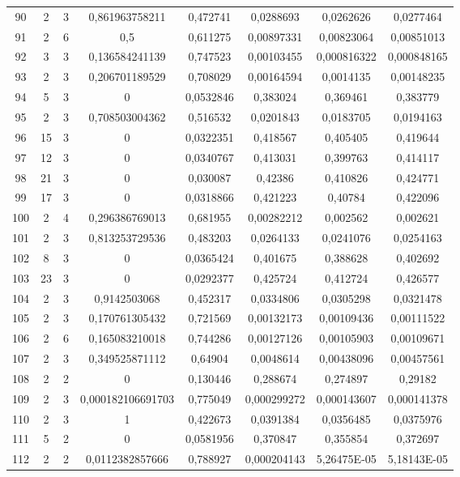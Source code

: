 \begin{longtable}{|c|c|c|c|c|c|c|c|}
90 & 2 & 3 & 0,861963758211 & 0,472741 & 0,0288693 & 0,0262626 & 0,0277464  \\
91 & 2 & 6 & 0,5 & 0,611275 & 0,00897331 & 0,00823064 & 0,00851013  \\
92 & 3 & 3 & 0,136584241139 & 0,747523 & 0,00103455 & 0,000816322 & 0,000848165  \\
93 & 2 & 3 & 0,206701189529 & 0,708029 & 0,00164594 & 0,0014135 & 0,00148235  \\
94 & 5 & 3 & 0 & 0,0532846 & 0,383024 & 0,369461 & 0,383779  \\
95 & 2 & 3 & 0,708503004362 & 0,516532 & 0,0201843 & 0,0183705 & 0,0194163  \\
96 & 15 & 3 & 0 & 0,0322351 & 0,418567 & 0,405405 & 0,419644  \\
97 & 12 & 3 & 0 & 0,0340767 & 0,413031 & 0,399763 & 0,414117  \\
98 & 21 & 3 & 0 & 0,030087 & 0,42386 & 0,410826 & 0,424771  \\
99 & 17 & 3 & 0 & 0,0318866 & 0,421223 & 0,40784 & 0,422096  \\
100 & 2 & 4 & 0,296386769013 & 0,681955 & 0,00282212 & 0,002562 & 0,002621  \\
101 & 2 & 3 & 0,813253729536 & 0,483203 & 0,0264133 & 0,0241076 & 0,0254163  \\
102 & 8 & 3 & 0 & 0,0365424 & 0,401675 & 0,388628 & 0,402692  \\
103 & 23 & 3 & 0 & 0,0292377 & 0,425724 & 0,412724 & 0,426577  \\
104 & 2 & 3 & 0,9142503068 & 0,452317 & 0,0334806 & 0,0305298 & 0,0321478  \\
105 & 2 & 3 & 0,170761305432 & 0,721569 & 0,00132173 & 0,00109436 & 0,00111522  \\
106 & 2 & 6 & 0,165083210018 & 0,744286 & 0,00127126 & 0,00105903 & 0,00109671  \\
107 & 2 & 3 & 0,349525871112 & 0,64904 & 0,0048614 & 0,00438096 & 0,00457561  \\
108 & 2 & 2 & 0 & 0,130446 & 0,288674 & 0,274897 & 0,29182  \\
109 & 2 & 3 & 0,000182106691703 & 0,775049 & 0,000299272 & 0,000143607 & 0,000141378  \\
110 & 2 & 3 & 1 & 0,422673 & 0,0391384 & 0,0356485 & 0,0375976  \\
111 & 5 & 2 & 0 & 0,0581956 & 0,370847 & 0,355854 & 0,372697  \\
112 & 2 & 2 & 0,0112382857666 & 0,788927 & 0,000204143 & 5,26475E-05 & 5,18143E-05  \\

\end{longtable}
